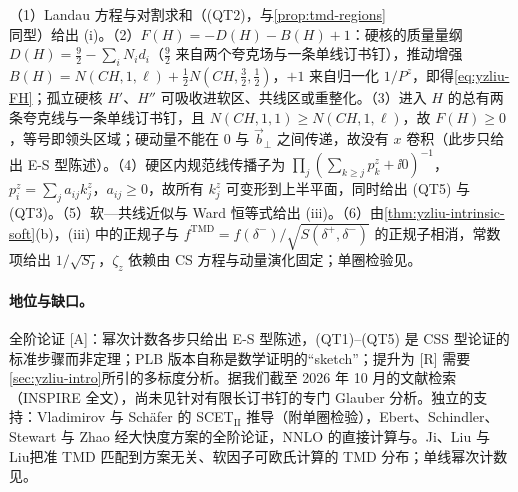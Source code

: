 \begin{proofsketch}
（1）Landau 方程\cite[附录~C]{Liu:2022nnk}与对割求和（(QT2)，与\cref{prop:tmd-regions}同型）给出 (i)。（2）$F(H)=-D(H)-B(H)+1$：硬核的质量量纲 $D(H)=\frac92-\sum_iN_id_i$（$\frac92$ 来自两个夸克场与一条单线订书钉），推动增强 $B(H)=N(CH,1,\ell)+\frac12N(CH,\frac32,\frac12)$，$+1$ 来自归一化 $1/P^z$，即得\cref{eq:yzliu-FH}；孤立硬核 $H'$、$H''$ 可吸收进软区、共线区或重整化\cite[式~(54)--(61)]{Liu:2022nnk}。（3）进入 $H$ 的总有两条夸克线与一条单线订书钉，且 $N(CH,1,1)\ge N(CH,1,\ell)$，故 $F(H)\ge0$，等号即领头区域；硬动量不能在 $0$ 与 $\vec b_\perp$ 之间传递，故没有 $x$ 卷积\cite[式~(64)--(68)]{Liu:2022nnk}（此步只给出 E-S 型陈述）。（4）硬区内规范线传播子为 $\prod_j(\sum_{k\ge j}p^z_k+\ii0)^{-1}$，$p^z_i=\sum_ja_{ij}k^z_j$，$a_{ij}\ge0$，故所有 $k^z_j$ 可变形到上半平面，同时给出 (QT5) 与 (QT3)\cite[式~(62)--(63)]{Liu:2022nnk}。（5）软—共线近似与 Ward 恒等式给出 (iii)。（6）由\cref{thm:yzliu-intrinsic-soft}(b)，(iii) 中的正规子与 $f^{\mathrm{TMD}}=f(\delta^-)/\sqrt{S(\delta^+,\delta^-)}$ 的正规子相消，常数项给出 $1/\sqrt{S_I}$，$\zeta_z$ 依赖由 CS 方程与动量演化固定；单圈检验见\cite[式~(23)、(39)、(85)]{Liu:2022nnk}。
\end{proofsketch}

\paragraph{地位与缺口。}全阶论证 [A]：幂次计数各步只给出 E-S 型陈述，(QT1)--(QT5) 是 CSS 型论证的标准步骤而非定理；PLB 版本自称是数学证明的“sketch”\cite{Ji:2019ewn}；提升为 [R] 需要\cref{sec:yzliu-intro}所引的多标度分析。据我们截至 2026 年 10 月的文献检索（INSPIRE 全文），尚未见针对有限长订书钉的专门 Glauber 分析。独立的支持：Vladimirov 与 Schäfer 的 SCET$_{\mathrm{II}}$ 推导（附单圈检验）\cite{Vladimirov:2020ofp}，Ebert、Schindler、Stewart 与 Zhao 经大快度方案的全阶论证\cite{Ebert:2022fmh}，NNLO 的直接计算\cite{delRio:2023pse}与\cite{Ji:2023pba}。Ji、Liu 与 Liu\cite{Ji:2019ewn}把准 TMD 匹配到方案无关、软因子可欧氏计算的 TMD 分布；单线幂次计数见\cite[式~(54)--(68)]{Liu:2022nnk}。

